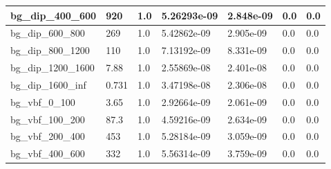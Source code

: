 \documentclass[a4paper, 10pt]{article}
\begin{document}
\begin{table}[H]
\begin{center}
\begin{tabular}{|m{23.0mm}|m{23.0mm}|m{18.0mm}|m{19.0mm}|m{19.0mm}|m{19.0mm}|m{19.0mm}|}
      \hline
      {\cellcolor{white}         bg\_dip\_400\_600}& {\cellcolor{white}         920}& {\cellcolor{white}         1.0}& {\cellcolor{white}         5.26293e-09}& {\cellcolor{white}         2.848e-09}& {\cellcolor{green}         0.0}& {\cellcolor{green}         0.0}\\
      \hline
      {\cellcolor{white}         bg\_dip\_600\_800}& {\cellcolor{white}         269}& {\cellcolor{white}         1.0}& {\cellcolor{white}         5.42862e-09}& {\cellcolor{white}         2.905e-09}& {\cellcolor{green}         0.0}& {\cellcolor{green}         0.0}\\
      \hline
      {\cellcolor{white}         bg\_dip\_800\_1200}& {\cellcolor{white}         110}& {\cellcolor{white}         1.0}& {\cellcolor{white}         7.13192e-09}& {\cellcolor{white}         8.331e-09}& {\cellcolor{green}         0.0}& {\cellcolor{green}         0.0}\\
      \hline
      {\cellcolor{white}         bg\_dip\_1200\_1600}& {\cellcolor{white}         7.88}& {\cellcolor{white}         1.0}& {\cellcolor{white}         2.55869e-08}& {\cellcolor{white}         2.401e-08}& {\cellcolor{green}         0.0}& {\cellcolor{green}         0.0}\\
      \hline
      {\cellcolor{white}         bg\_dip\_1600\_inf}& {\cellcolor{white}         0.731}& {\cellcolor{white}         1.0}& {\cellcolor{white}         3.47198e-08}& {\cellcolor{white}         2.306e-08}& {\cellcolor{green}         0.0}& {\cellcolor{green}         0.0}\\
      \hline
      {\cellcolor{white}         bg\_vbf\_0\_100}& {\cellcolor{white}         3.65}& {\cellcolor{white}         1.0}& {\cellcolor{white}         2.92664e-09}& {\cellcolor{white}         2.061e-09}& {\cellcolor{green}         0.0}& {\cellcolor{green}         0.0}\\
      \hline
      {\cellcolor{white}         bg\_vbf\_100\_200}& {\cellcolor{white}         87.3}& {\cellcolor{white}         1.0}& {\cellcolor{white}         4.59216e-09}& {\cellcolor{white}         2.634e-09}& {\cellcolor{green}         0.0}& {\cellcolor{green}         0.0}\\
      \hline
      {\cellcolor{white}         bg\_vbf\_200\_400}& {\cellcolor{white}         453}& {\cellcolor{white}         1.0}& {\cellcolor{white}         5.28184e-09}& {\cellcolor{white}         3.059e-09}& {\cellcolor{green}         0.0}& {\cellcolor{green}         0.0}\\
      \hline
      {\cellcolor{white}         bg\_vbf\_400\_600}& {\cellcolor{white}         332}& {\cellcolor{white}         1.0}& {\cellcolor{white}         5.56314e-09}& {\cellcolor{white}         3.759e-09}& {\cellcolor{green}         0.0}& {\cellcolor{green}         0.0}\\

\end{tabular}
\end{center}
\end{table}
\end{document}
